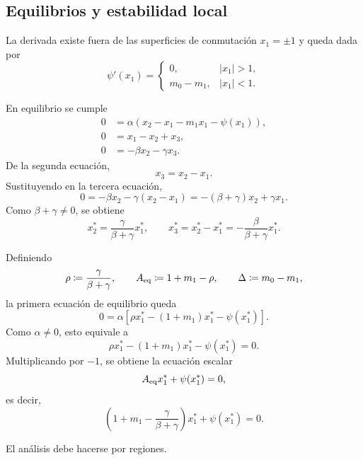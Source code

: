\documentclass[journal]{IEEEtran}
\begin{document}
\subsection{Equilibrios y estabilidad local}

La derivada existe fuera de las superficies de conmutación
$x_1=\pm 1$ y queda dada por
\begin{equation}
\psi'(x_1)=
\begin{cases}
0, & |x_1|>1,\\[1mm]
m_0-m_1, & |x_1|<1.
\end{cases}
\end{equation}

En equilibrio se cumple
\begin{equation}
\label{eq:ns_equilibrium_conditions}
\begin{aligned}
0&=\alpha(x_2-x_1-m_1x_1-\psi(x_1)),\\
0&=x_1-x_2+x_3,\\
0&=-\beta x_2-\gamma x_3.
\end{aligned}
\end{equation}
De la segunda ecuación,
\[
x_3=x_2-x_1.
\]
Sustituyendo en la tercera ecuación,
\[
0=-\beta x_2-\gamma(x_2-x_1)
=-(\beta+\gamma)x_2+\gamma x_1.
\]
Como \(\beta+\gamma\neq 0\), se obtiene
\begin{equation}
\label{eq:yz_equilibrio_ns}
x_2^*=\frac{\gamma}{\beta+\gamma}x_1^*,
\qquad
x_3^*
=
x_2^*-x_1^*
=
-\frac{\beta}{\beta+\gamma}x_1^*.
\end{equation}

Definiendo
\begin{equation}
\label{eq:rho_A_delta_ns}
\rho\coloneqq \frac{\gamma}{\beta+\gamma},
\qquad
A_{\rm eq}\coloneqq 1+m_1-\rho,
\qquad
\Delta\coloneqq m_0-m_1,
\end{equation}
la primera ecuación de equilibrio queda
\[
0=
\alpha\left[
\rho x_1^*-(1+m_1)x_1^*-\psi(x_1^*)
\right].
\]
Como \(\alpha\neq 0\), esto equivale a
\[
\rho x_1^*-(1+m_1)x_1^*-\psi(x_1^*)=0.
\]
Multiplicando por \(-1\), se obtiene la ecuación escalar
\begin{equation}
\label{eq:scalar_equilibrium_ns}
A_{\rm eq} x_1^*+\psi(x_1^*)=0,
\end{equation}
es decir,
\begin{equation}
\left(1+m_1-\frac{\gamma}{\beta+\gamma}\right)x_1^*
+
\psi(x_1^*)=0.
\end{equation}

El análisis debe hacerse por regiones.
\end{document}
